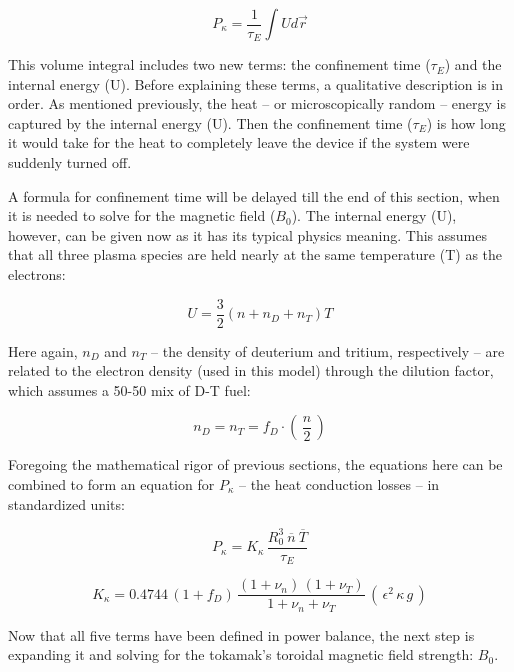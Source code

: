 \begin{equation}
	P_\kappa = \frac{1}{\tau_E} \int U d \vec r
\end{equation}

This volume integral includes two new terms: the confinement time ($\tau_E$) and the internal energy (U). Before explaining these terms, a qualitative description is in order. As mentioned previously, the heat -- or microscopically random -- energy is captured by the internal energy (U). Then the confinement time ($\tau_E$) is how long it would take for the heat to completely leave the device if the system were suddenly turned off.

A formula for confinement time will be delayed till the end of this section, when it is needed to solve for the magnetic field ($B_0$). The internal energy (U), however, can be given now as it has its typical physics meaning. This assumes that all three plasma species are held nearly at the same temperature (T) as the electrons:

\begin{equation}
	U = \frac{3}{2} \left( n + n_D + n_T \right) T
\end{equation}

Here again, $n_D$ and $n_T$ -- the density of deuterium and tritium, respectively -- are related to the electron density (used in this model) through the dilution factor, which assumes a 50-50 mix of D-T fuel:

\begin{equation}
	n_D = n_T = f_D \cdot \left( \, \frac{n}{2} \, \right)
\end{equation}

Foregoing the mathematical rigor of previous sections, the equations here can be combined to form an equation for $P_\kappa$ -- the heat conduction losses -- in standardized units:

\begin{equation}
	\label{eq:pkappa}
	P_\kappa = K_\kappa \, \frac{ R_0 ^ 3 \ \overline{n}  \ \overline{T}  }{\tau_E} 
\end{equation}

\begin{equation}
	K_\kappa = 0.4744 \, ( 1 + f_D ) \, \frac{ (1 + \nu_n) \, (1 + \nu_T) }{1 + \nu_n + \nu_T } \, ( \, \epsilon^2 \, \kappa \, g \, )
\end{equation}

Now that all five terms have been defined in power balance, the next step is expanding it and solving for the tokamak's toroidal magnetic field strength: $B_0$.

